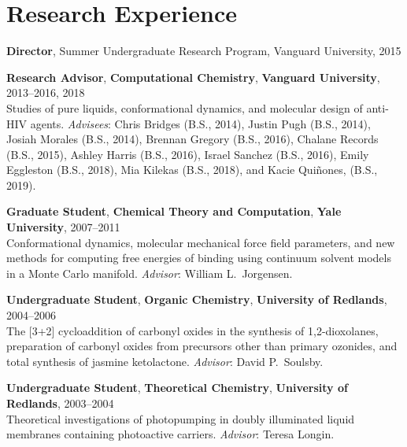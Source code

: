 \documentclass[11pt]{article}
\newcommand{\resitem}[7]{\textbf{#1}, \textbf{#2}, \textbf{#3}, #4\\#5 \textit{#6}: #7}
\begin{document}

\section{Research Experience}


\textbf{Director}, Summer Undergraduate Research Program, Vanguard University, 2015 

\resitem{Research Advisor}{Computational Chemistry}{Vanguard University}{2013--2016, 2018}
{Studies of pure liquids, conformational dynamics, and molecular design of anti-HIV agents.}
{Advisees}{Chris Bridges (B.S., 2014), Justin Pugh (B.S., 2014), Josiah Morales (B.S., 2014), Brennan Gregory (B.S., 2016), Chalane Records (B.S., 2015), Ashley Harris (B.S., 2016),  Israel Sanchez (B.S., 2016), Emily Eggleston (B.S., 2018), Mia Kilekas (B.S., 2018), and Kacie Qui\~nones, (B.S., 2019).}

\resitem{Graduate Student}{Chemical Theory and Computation}{Yale University}{2007--2011}
{Conformational dynamics, molecular mechanical 
force field parameters, and new methods for computing free 
energies of binding using continuum solvent models in a Monte Carlo 
manifold.}{Advisor}{William L.\ Jorgensen.}

\resitem{Undergraduate Student}{Organic Chemistry}{University of Redlands}{2004--2006}
{The [3+2] cycloaddition of carbonyl oxides in the synthesis of 1,2-dioxolanes, 
preparation of carbonyl oxides from precursors other than primary ozonides, 
and total synthesis of jasmine ketolactone.}{Advisor}{David P.\ Soulsby.}

\resitem{Undergraduate Student}{Theoretical Chemistry}{University of Redlands}{2003--2004}
{Theoretical investigations of photopumping in doubly illuminated liquid membranes containing photoactive carriers.}{Advisor}
{Teresa Longin.}

\end{document}

